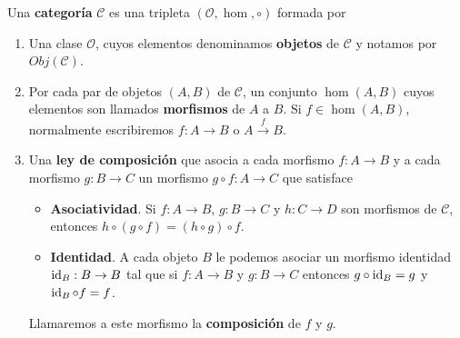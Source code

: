 \begin{definicion}
	Una \textbf{categoría} \(\mathcal{C}\) es una tripleta
	\((\mathcal{O}, \hom, \circ)\) formada por
	\begin{enumerate}
		\item Una clase \(\mathcal{O}\), cuyos elementos denominamos \textbf{objetos} de
		\(\mathcal{C}\) y notamos por \(Obj(\mathcal{C})\).
		
		\item Por cada par de objetos \((A,B)\) de \(\mathcal{C}\), un conjunto
		\(\hom(A,B)\) cuyos elementos son llamados \textbf{morfismos} de \(A\) a \(B\).
		Si \(f \in \hom(A,B)\), normalmente escribiremos \(f: A \rightarrow B\) o \(A \xrightarrow
		{f}B\).
		
		\item Una \textbf{ley de composición} que asocia a cada morfismo
		\(f: A \rightarrow B\) y a cada morfismo \(g: B \rightarrow C\) un morfismo
		\(g \circ f : A \rightarrow C\) que satisface
		\begin{itemize}
			\item \textbf{Asociatividad}. Si \(f: A \rightarrow B\),
			\(g: B \rightarrow C\) y \(h : C \rightarrow D\) son morfismos de
			\(\mathcal{C}\), entonces \(h \circ (g \circ f) = (h \circ g) \circ f\).
			
			\item \textbf{Identidad}. A cada objeto \(B\) le podemos asociar un morfismo
			identidad \(\operatorname{id}_{B}: B \rightarrow B\) tal que si \(f: A \rightarrow B\) y
			\(g: B \rightarrow C\) entonces \(g \circ \operatorname{id}_{B}= g\) y \(\operatorname{id}_{B}\circ f =
			f\).
		\end{itemize}
		Llamaremos a este morfismo la \textbf{composición} de \(f\) y \(g\).
	\end{enumerate}
\end{definicion}

